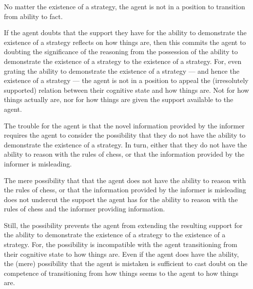 \documentclass[10pt]{article}
\begin{document}
\begin{note}
  No matter the existence of a strategy, the agent is not in a position to transition from ability to fact.

  If the agent doubts that the support they have for the ability to demonstrate the existence of a strategy reflects on how things are, then this commits the agent to doubting the significance of the reasoning from the possession of the ability to demonstrate the existence of a strategy to the existence of a strategy.
  For, even grating the ability to demonstrate the existence of a strategy --- and hence the existence of a strategy --- the agent is not in a position to appeal the (irresolutely supported) relation between their cognitive state and how things are.
  Not for how things actually are, nor for how things are given the support available to the agent.
\end{note}

\begin{note}
  The trouble for the agent is that the novel information provided by the informer requires the agent to consider the possibility that they do not have the ability to demonstrate the existence of a strategy.
  In turn, either that they do not have the ability to reason with the rules of chess, or that the information provided by the informer is misleading.

  The mere possibility that that the agent does not have the ability to reason with the rules of chess, or that the information provided by the informer is misleading does not undercut the support the agent has for the ability to reason with the rules of chess and the informer providing information.

  Still, the possibility prevents the agent from extending the resulting support for the ability to demonstrate the existence of a strategy to the existence of a strategy.
  For, the possibility is incompatible with the agent transitioning from their cognitive state to how things are.
  Even if the agent does have the ability, the (mere) possibility that the agent is mistaken is sufficient to cast doubt on the competence of transitioning from how things seems to the agent to how things are.
\end{note}
\end{document}
